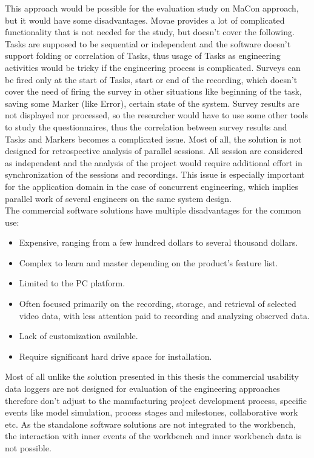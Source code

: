  This approach would be possible for the evaluation study on MaCon approach, but it would have some disadvantages. Movae provides a lot of complicated functionality that is not needed for the study, but doesn't cover the following. Tasks are supposed to be sequential or independent and the software doesn't support folding or correlation of Tasks, thus usage of Tasks as engineering activities would be tricky if the engineering process is complicated. Surveys can be fired only at the start of Tasks, start or end of the recording, which doesn't cover the need of firing the survey in other situations like beginning of the task, saving some Marker (like Error), certain state of the system. Survey results are not displayed nor processed, so the researcher would have to use some other tools to study the questionnaires, thus the correlation between survey results and Tasks and Markers becomes a complicated issue. Most of all, the solution is not designed for retrospective analysis of parallel sessions. All session are considered as independent and the analysis of the project would require additional effort in synchronization of the sessions and recordings. This issue is especially important for the application domain in the case of concurrent engineering, which implies parallel work of several engineers on the same system design.\\ 

The commercial software solutions have multiple disadvantages for the common use:

\begin{itemize}
\item Expensive, ranging from a few hundred dollars to several thousand dollars.
\item Complex to learn and master depending on the product's feature list.
\item Limited to the PC platform.
\item Often focused primarily on the recording, storage, and retrieval of selected video data, with less attention paid to recording and analyzing observed data.
\item Lack of customization available.
\item Require significant hard drive space for installation.
\end{itemize}

Most of all unlike the solution presented in this thesis the commercial usability data loggers are not designed for evaluation of the engineering approaches therefore don't adjust to the manufacturing project development process, specific events like model simulation, process stages and milestones, collaborative work etc. As the standalone software solutions are not integrated to the workbench, the interaction with inner events of the workbench and inner workbench data is not possible.\\

